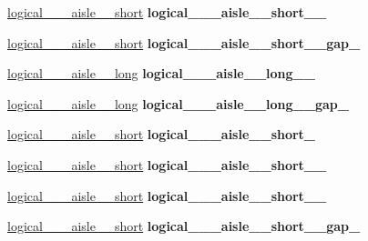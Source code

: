 \begin{DoxyCompactItemize}
\hyperlink{structPresetLocation}{logical\+\_\+\_\+\_\+aisle\+\_\+\_\+short} {\bfseries logical\+\_\+\_\+\_\+aisle\+\_\+\_\+short\+\_\+\_\+}
\item 
\mbox{\label{classGantryControl_a2943999bcfc4229947c6bf40d0f0e1e5}} 
\hyperlink{structPresetLocation}{logical\+\_\+\_\+\_\+aisle\+\_\+\_\+short} {\bfseries logical\+\_\+\_\+\_\+aisle\+\_\+\_\+short\+\_\+\_\+gap\+\_\+}
\item 
\mbox{\label{classGantryControl_af518f56682cc0f32bf0d1c2050210ec8}} 
\hyperlink{structPresetLocation}{logical\+\_\+\_\+\_\+aisle\+\_\+\_\+long} {\bfseries logical\+\_\+\_\+\_\+aisle\+\_\+\_\+long\+\_\+\_\+}
\item 
\mbox{\label{classGantryControl_a845ba7bc8a19b80657cc4c3f5dee78f6}} 
\hyperlink{structPresetLocation}{logical\+\_\+\_\+\_\+aisle\+\_\+\_\+long} {\bfseries logical\+\_\+\_\+\_\+aisle\+\_\+\_\+long\+\_\+\_\+gap\+\_\+}
\item 
\mbox{\label{classGantryControl_a98e76d6f22ec7d56a61f71d0e428cf99}} 
\hyperlink{structPresetLocation}{logical\+\_\+\_\+\_\+aisle\+\_\+\_\+short} {\bfseries logical\+\_\+\_\+\_\+aisle\+\_\+\_\+short\+\_\+}
\item 
\mbox{\label{classGantryControl_a9b98204281bae3ae91ac0b416f5533b5}} 
\hyperlink{structPresetLocation}{logical\+\_\+\_\+\_\+aisle\+\_\+\_\+short} {\bfseries logical\+\_\+\_\+\_\+aisle\+\_\+\_\+short\+\_\+\_\+}
\item 
\mbox{\label{classGantryControl_a6a48c026811e6c490b27b7ae8a8d074f}} 
\hyperlink{structPresetLocation}{logical\+\_\+\_\+\_\+aisle\+\_\+\_\+short} {\bfseries logical\+\_\+\_\+\_\+aisle\+\_\+\_\+short\+\_\+\_\+}
\item 
\mbox{\label{classGantryControl_aed2ffb62272a50e086f126bc9a7d3f38}} 
\hyperlink{structPresetLocation}{logical\+\_\+\_\+\_\+aisle\+\_\+\_\+short} {\bfseries logical\+\_\+\_\+\_\+aisle\+\_\+\_\+short\+\_\+\_\+gap\+\_\+}

\end{DoxyCompactItemize}

